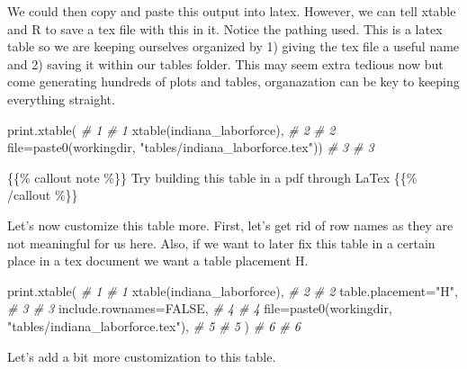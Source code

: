 \documentclass[
]{book}
\newenvironment{Shaded}{\begin{snugshade}}{\end{snugshade}}
\newcommand{\AttributeTok}[1]{\textcolor[rgb]{0.77,0.63,0.00}{#1}}
\newcommand{\CommentTok}[1]{\textcolor[rgb]{0.56,0.35,0.01}{\textit{#1}}}
\newcommand{\ConstantTok}[1]{\textcolor[rgb]{0.00,0.00,0.00}{#1}}
\newcommand{\FunctionTok}[1]{\textcolor[rgb]{0.00,0.00,0.00}{#1}}
\newcommand{\NormalTok}[1]{#1}
\newcommand{\StringTok}[1]{\textcolor[rgb]{0.31,0.60,0.02}{#1}}
\begin{document}
We could then copy and paste this output into latex. However, we can tell xtable and R to save a tex file with this in it. Notice the pathing used. This is a latex table so we are keeping ourselves organized by 1) giving the tex file a useful name and 2) saving it within our tables folder. This may seem extra tedious now but come generating hundreds of plots and tables, organazation can be key to keeping everything straight.

\begin{Shaded}
\begin{Highlighting}[]
  \FunctionTok{print.xtable}\NormalTok{(                                                }\CommentTok{\# 1  \# 1}
    \FunctionTok{xtable}\NormalTok{(indiana\_laborforce),                                }\CommentTok{\# 2  \# 2}
    \AttributeTok{file=}\FunctionTok{paste0}\NormalTok{(workingdir, }\StringTok{"tables/indiana\_laborforce.tex"}\NormalTok{))  }\CommentTok{\# 3  \# 3}
\end{Highlighting}
\end{Shaded}

\{\{\% callout note \%\}\}
Try building this table in a pdf through LaTex
\{\{\% /callout \%\}\}

Let's now customize this table more. First, let's get rid of row names as they are not meaningful for us here. Also, if we want to later fix this table in a certain place in a tex document we want a table placement H.

\begin{Shaded}
\begin{Highlighting}[]
\FunctionTok{print.xtable}\NormalTok{(                                                 }\CommentTok{\# 1  \# 1}
  \FunctionTok{xtable}\NormalTok{(indiana\_laborforce),                                 }\CommentTok{\# 2  \# 2}
  \AttributeTok{table.placement=}\StringTok{"H"}\NormalTok{,                                        }\CommentTok{\# 3  \# 3}
  \AttributeTok{include.rownames=}\ConstantTok{FALSE}\NormalTok{,                                     }\CommentTok{\# 4  \# 4}
  \AttributeTok{file=}\FunctionTok{paste0}\NormalTok{(workingdir, }\StringTok{"tables/indiana\_laborforce.tex"}\NormalTok{),   }\CommentTok{\# 5  \# 5}
\NormalTok{  )                                                           }\CommentTok{\# 6  \# 6}
\end{Highlighting}
\end{Shaded}

Let's add a bit more customization to this table.
\end{document}
